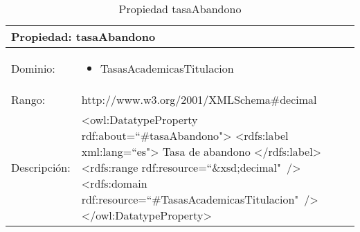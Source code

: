 \begin{table}[!ht]
	\centering
	\begin{tabular}{|p{}|p{}|}
		\hline
		\multicolumn{2}{|l|}{Propiedad: \textbf{tasaAbandono}}
		\\ \hline
		Dominio:&
		\begin{itemize}
			\item TasasAcademicasTitulacion
		\end{itemize}
		\\ \hline
		Rango:&
		http://www.w3.org/2001/XMLSchema\#decimal
		\\ \hline
		Descripción:&
		\textless owl:DatatypeProperty rdf:about=``\#tasaAbandono"\textgreater\newline 
		\tab\textless rdfs:label xml:lang=``es"\textgreater\newline
		\tab\tab Tasa de abandono\newline
		\tab\textless /rdfs:label\textgreater\newline
		\tab\textless rdfs:range\newline
		\tab\tab rdf:resource=``\&xsd;decimal"\ /\textgreater\newline
		\tab\textless rdfs:domain\newline
		\tab\tab rdf:resource=``\#TasasAcademicasTitulacion"\ /\textgreater\newline
		\textless /owl:DatatypeProperty\textgreater
		\\ \hline
	\end{tabular}
	\caption{Propiedad tasaAbandono}
	\label{propiedad-tasaabandono}
\end{table}

